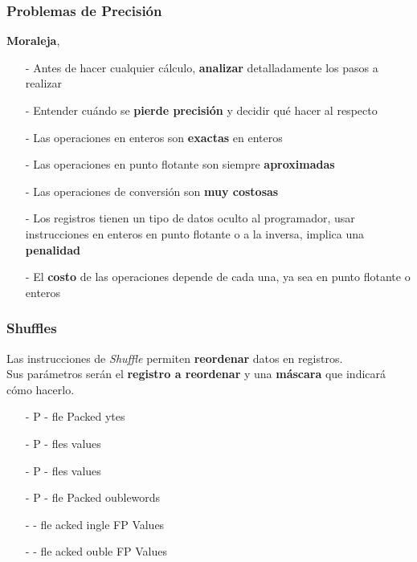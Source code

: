 \documentclass[aspectratio=169]{beamer}
\begin{document}
\begin{frame}[fragile]
	\frametitle{Problemas de Precisión}
	\textbf{Moraleja},\\
	\begin{itemize}
	 \vskip 7pt \item[-] Antes de hacer cualquier cálculo, \textbf{analizar} detalladamente los pasos a realizar
	 \pause
	 \vskip 7pt \item[-] Entender cuándo se \textbf{pierde precisión} y decidir qué hacer al respecto
	 \pause
	 \vskip 7pt \item[-] Las operaciones en enteros son \textbf{exactas} en enteros
	 \pause
	 \vskip 7pt \item[-] Las operaciones en punto flotante son siempre \textbf{aproximadas}
	 \pause
	 \vskip 7pt \item[-] Las operaciones de conversión son \textbf{muy costosas}
	 \pause
	 \vskip 7pt \item[-] Los registros tienen un tipo de datos oculto al programador, usar instrucciones en enteros en punto flotante o a la inversa, implica una \textbf{penalidad}
	 \pause
	 \vskip 7pt \item[-] El \textbf{costo} de las operaciones depende de cada una, ya sea en punto flotante o enteros
	\end{itemize}
\end{frame}

\begin{frame}[fragile,t]
	\frametitle{Shuffles}
	Las instrucciones de \emph{Shuffle} permiten \textbf{reordenar} datos en registros.\\
	Sus parámetros serán el \textbf{registro a reordenar} y una \textbf{máscara} que indicará cómo hacerlo.
	\vskip 10pt
	\pause
	\begin{itemize}
	 \item[-] P{\color{a}{SHUF}}{\color{v}{B}} - {\color{a}{Shuf}}fle Packed {\color{v}{B}}ytes
	 \item[-] P{\color{a}{SHUF}}{\color{orange}{H}}{\color{v}{W}} - {\color{a}{Shuf}}fles {\color{orange}{high}} {\color{v}{16bit}} values
	 \item[-] P{\color{a}{SHUF}}{\color{orange}{L}}{\color{v}{W}} - {\color{a}{Shuf}}fles {\color{orange}{low}} {\color{v}{16bit}} values
	 \item[-] P{\color{a}{SHUF}}{\color{v}{D}} - {\color{a}{Shuf}}fle Packed {\color{v}{D}}oublewords
	\end{itemize}
	\begin{itemize}
	 \item[-] {\color{a}{SHUF}}{\color{r}{P}}{\color{v}{S}} - {\color{a}{Shuf}}fle {\color{r}{P}}acked {\color{v}{S}}ingle FP Values
	 \item[-] {\color{a}{SHUF}}{\color{r}{P}}{\color{v}{D}} - {\color{a}{Shuf}}fle {\color{r}{P}}acked {\color{v}{D}}ouble FP Values
	\end{itemize}
\end{frame}
\end{document}
